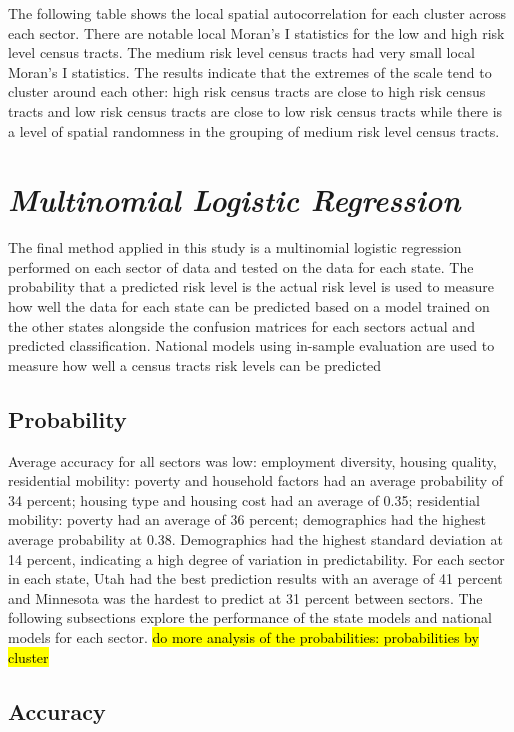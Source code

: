 The following table shows the local spatial autocorrelation for each cluster across each sector. There are notable local Moran's I statistics for the low and high risk level census tracts. The medium risk level census tracts had very small local Moran's I statistics. The results indicate that the extremes of the scale tend to cluster around each other: high risk census tracts are close to high risk census tracts and low risk census tracts are close to low risk census tracts while there is a level of spatial randomness in the grouping of medium risk level census tracts. 



\section{\textit{Multinomial Logistic Regression}}

The final method applied in this study is a multinomial logistic regression performed on each sector of data and tested on the data for each state. The probability that a predicted risk level is the actual risk level is used to measure how well the data for each state can be predicted based on a model trained on the other states alongside the confusion matrices for each sectors actual and predicted classification. National models using in-sample evaluation are used to measure how well a census tracts risk levels can be predicted

\subsection{Probability}
Average accuracy for all sectors was low: employment diversity, housing quality, residential mobility: poverty and household factors had an average probability of 34 percent; housing type and housing cost had an average of 0.35; residential mobility: poverty had an average of 36 percent; demographics had the highest average probability at 0.38. Demographics had the highest standard deviation at 14 percent, indicating a high degree of variation in predictability. For each sector in each state, Utah had the best prediction results with an average of 41 percent and Minnesota was the hardest to predict at 31 percent between sectors. The following subsections explore the performance of the state models and national models for each sector. \hl{do more analysis of the probabilities: probabilities by cluster}

\subsection{Accuracy}


